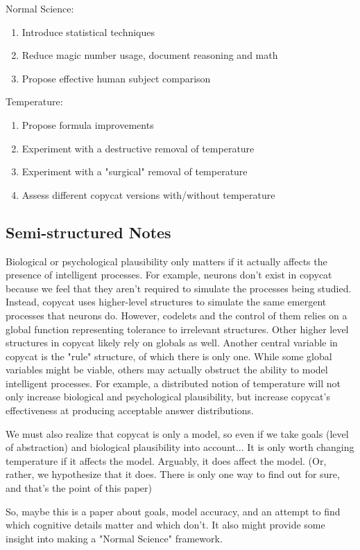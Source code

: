 \documentclass[a4paper]{article}
\begin{document}
Normal Science:
\begin{enumerate}
	\item Introduce statistical techniques
    \item Reduce magic number usage, document reasoning and math
    \item Propose effective human subject comparison
\end{enumerate}
Temperature:
\begin{enumerate}
	\item Propose formula improvements
    \item Experiment with a destructive removal of temperature
    \item Experiment with a "surgical" removal of temperature
    \item Assess different copycat versions with/without temperature
\end{enumerate}

\subsection{Semi-structured Notes}

Biological or psychological plausibility only matters if it actually affects the presence of intelligent processes. For example, neurons don't exist in copycat because we feel that they aren't required to simulate the processes being studied. Instead, copycat uses higher-level structures to simulate the same emergent processes that neurons do. However, codelets and the control of them relies on a global function representing tolerance to irrelevant structures. Other higher level structures in copycat likely rely on globals as well. Another central variable in copycat is the "rule" structure, of which there is only one. While some global variables might be viable, others may actually obstruct the ability to model intelligent processes. For example, a distributed notion of temperature will not only increase biological and psychological plausibility, but increase copycat's effectiveness at producing acceptable answer distributions.

We must also realize that copycat is only a model, so even if we take goals (level of abstraction) and biological plausibility into account...
It is only worth changing temperature if it affects the model.
Arguably, it does affect the model. (Or, rather, we hypothesize that it does. There is only one way to find out for sure, and that's the point of this paper)

So, maybe this is a paper about goals, model accuracy, and an attempt to find which cognitive details matter and which don't. It also might provide some insight into making a "Normal Science" framework.
\end{document}
